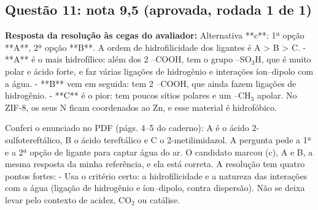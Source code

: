 \documentclass{article}%
\begin{document}
\subsection*{Questão 11: nota 9,5 (aprovada, rodada 1 de 1)}%
\textbf{Resposta da resolução às cegas do avaliador:} Alternativa **c**: 1ª opção **A**, 2ª opção **B**.\newline%
\newline%
A ordem de hidrofilicidade dos ligantes é A > B > C.\newline%
{-} **A** é o mais hidrofílico: além dos 2 --COOH, tem o grupo --SO$_{3}$H, que é muito polar e ácido forte, e faz várias ligações de hidrogênio e interações íon--dipolo com a água.\newline%
{-} **B** vem em seguida: tem 2 --COOH, que ainda fazem ligações de hidrogênio.\newline%
{-} **C** é o pior: tem poucos sítios polares e um --CH$_{3}$ apolar. No ZIF{-}8, os seus N ficam coordenados ao Zn, e esse material é hidrofóbico.\par %
Conferi o enunciado no PDF (págs. 4--5 do caderno): A é o ácido 2{-}sulfotereftálico, B o ácido tereftálico e C o 2{-}metilimidazol. A pergunta pede a 1ª e a 2ª opção de ligante para captar água do ar. O candidato marcou (c), A e B, a mesma resposta da minha referência, e ela está correta.\newline%
\newline%
A resolução tem quatro pontos fortes:\newline%
{-} Usa o critério certo: a hidrofilicidade e a natureza das interações com a água (ligação de hidrogênio e íon--dipolo, contra dispersão). Não se deixa levar pelo contexto de acidez, CO$_{2}$ ou catálise.\newline%
\end{document}

